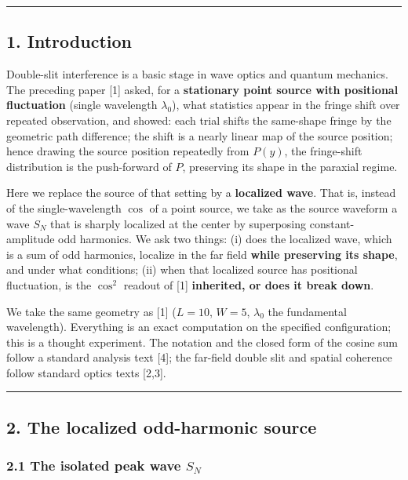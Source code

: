\documentclass[
]{article}
\begin{document}
\begin{center}\rule{0.5\linewidth}{0.5pt}\end{center}

\subsection{1. Introduction}\label{introduction}

Double-slit interference is a basic stage in wave optics and quantum
mechanics. The preceding paper {[}1{]} asked, for a \textbf{stationary
point source with positional fluctuation} (single wavelength
\(\lambda_0\)), what statistics appear in the fringe shift over repeated
observation, and showed: each trial shifts the same-shape fringe by the
geometric path difference; the shift is a nearly linear map of the
source position; hence drawing the source position repeatedly from
\(P(y)\), the fringe-shift distribution is the push-forward of \(P\),
preserving its shape in the paraxial regime.

Here we replace the source of that setting by a \textbf{localized wave}.
That is, instead of the single-wavelength \(\cos\) of a point source, we
take as the source waveform a wave \(S_N\) that is sharply localized at
the center by superposing constant-amplitude odd harmonics. We ask two
things: (i) does the localized wave, which is a sum of odd harmonics,
localize in the far field \textbf{while preserving its shape}, and under
what conditions; (ii) when that localized source has positional
fluctuation, is the \(\cos^2\) readout of {[}1{]} \textbf{inherited, or
does it break down}.

We take the same geometry as {[}1{]} (\(L=10\), \(W=5\), \(\lambda_0\)
the fundamental wavelength). Everything is an exact computation on the
specified configuration; this is a thought experiment. The notation and
the closed form of the cosine sum follow a standard analysis text
{[}4{]}; the far-field double slit and spatial coherence follow standard
optics texts {[}2,3{]}.

\begin{center}\rule{0.5\linewidth}{0.5pt}\end{center}

\subsection{2. The localized odd-harmonic
source}\label{the-localized-odd-harmonic-source}

\subsubsection{\texorpdfstring{2.1 The isolated peak wave
\(S_N\)}{2.1 The isolated peak wave S\_N}}\label{the-isolated-peak-wave-s_n}
\end{document}
